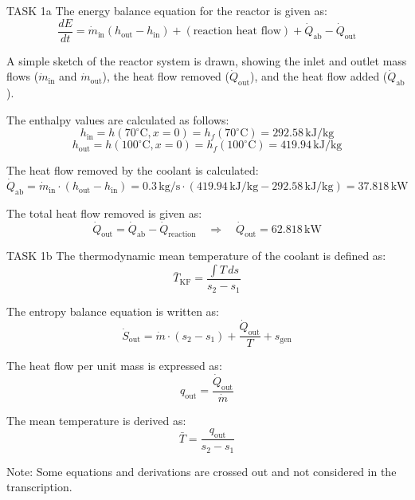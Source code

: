 TASK 1a  
The energy balance equation for the reactor is given as:  
\[
\frac{dE}{dt} = \dot{m}_{\text{in}} (h_{\text{out}} - h_{\text{in}}) + (\text{reaction heat flow}) + \dot{Q}_{\text{ab}} - \dot{Q}_{\text{out}}
\]  

A simple sketch of the reactor system is drawn, showing the inlet and outlet mass flows (\( \dot{m}_{\text{in}} \) and \( \dot{m}_{\text{out}} \)), the heat flow removed (\( \dot{Q}_{\text{out}} \)), and the heat flow added (\( \dot{Q}_{\text{ab}} \)).  

The enthalpy values are calculated as follows:  
\[
h_{\text{in}} = h(70^\circ\text{C}, x = 0) = h_f(70^\circ\text{C}) = 292.58 \, \text{kJ/kg}
\]  
\[
h_{\text{out}} = h(100^\circ\text{C}, x = 0) = h_f(100^\circ\text{C}) = 419.94 \, \text{kJ/kg}
\]  

The heat flow removed by the coolant is calculated:  
\[
\dot{Q}_{\text{ab}} = \dot{m}_{\text{in}} \cdot (h_{\text{out}} - h_{\text{in}}) = 0.3 \, \text{kg/s} \cdot (419.94 \, \text{kJ/kg} - 292.58 \, \text{kJ/kg}) = 37.818 \, \text{kW}
\]  

The total heat flow removed is given as:  
\[
\dot{Q}_{\text{out}} = \dot{Q}_{\text{ab}} - \dot{Q}_{\text{reaction}} \quad \Rightarrow \quad \dot{Q}_{\text{out}} = 62.818 \, \text{kW}
\]  

TASK 1b  
The thermodynamic mean temperature of the coolant is defined as:  
\[
\bar{T}_{\text{KF}} = \frac{\int T \, ds}{s_2 - s_1}
\]  

The entropy balance equation is written as:  
\[
\dot{S}_{\text{out}} = \dot{m} \cdot (s_2 - s_1) + \frac{\dot{Q}_{\text{out}}}{T} + s_{\text{gen}}
\]  

The heat flow per unit mass is expressed as:  
\[
q_{\text{out}} = \frac{\dot{Q}_{\text{out}}}{\dot{m}}
\]  

The mean temperature is derived as:  
\[
\bar{T} = \frac{q_{\text{out}}}{s_2 - s_1}
\]  

Note: Some equations and derivations are crossed out and not considered in the transcription.